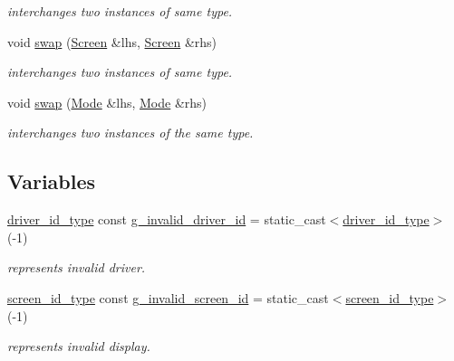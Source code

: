 \begin{DoxyCompactItemize}
\begin{DoxyCompactList}\small\item\em interchanges two instances of same type. \end{DoxyCompactList}\item 
void \hyperlink{namespacehryky_1_1display_ab3bf4cf01896ec9a96e6963093e57d8f}{swap} (\hyperlink{classhryky_1_1display_1_1_screen}{Screen} \&lhs, \hyperlink{classhryky_1_1display_1_1_screen}{Screen} \&rhs)
\begin{DoxyCompactList}\small\item\em interchanges two instances of same type. \end{DoxyCompactList}\item 
\hypertarget{namespacehryky_1_1display_a7d37702bac4e6b0ea0a0916f57e3fd97}{void \hyperlink{namespacehryky_1_1display_a7d37702bac4e6b0ea0a0916f57e3fd97}{swap} (\hyperlink{classhryky_1_1display_1_1_mode}{Mode} \&lhs, \hyperlink{classhryky_1_1display_1_1_mode}{Mode} \&rhs)}\label{namespacehryky_1_1display_a7d37702bac4e6b0ea0a0916f57e3fd97}

\begin{DoxyCompactList}\small\item\em interchanges two instances of the same type. \end{DoxyCompactList}\end{DoxyCompactItemize}
\subsection*{Variables}
\begin{DoxyCompactItemize}
\item 
\hypertarget{namespacehryky_1_1display_a411ce13cd5bc260cff5bd2c5deecbece}{\hyperlink{namespacehryky_1_1display_a438d20137cf00d71a4a72dfb7233ec90}{driver\-\_\-id\-\_\-type} const \hyperlink{namespacehryky_1_1display_a411ce13cd5bc260cff5bd2c5deecbece}{g\-\_\-invalid\-\_\-driver\-\_\-id} = static\-\_\-cast$<$\hyperlink{namespacehryky_1_1display_a438d20137cf00d71a4a72dfb7233ec90}{driver\-\_\-id\-\_\-type}$>$(-\/1)}\label{namespacehryky_1_1display_a411ce13cd5bc260cff5bd2c5deecbece}

\begin{DoxyCompactList}\small\item\em represents invalid driver. \end{DoxyCompactList}\item 
\hypertarget{namespacehryky_1_1display_af36e96781cbbf566b325a49fa7de7e28}{\hyperlink{namespacehryky_1_1display_a09f7398edae025e4ee4e505b5cdf954c}{screen\-\_\-id\-\_\-type} const \hyperlink{namespacehryky_1_1display_af36e96781cbbf566b325a49fa7de7e28}{g\-\_\-invalid\-\_\-screen\-\_\-id} = static\-\_\-cast$<$\hyperlink{namespacehryky_1_1display_a09f7398edae025e4ee4e505b5cdf954c}{screen\-\_\-id\-\_\-type}$>$(-\/1)}\label{namespacehryky_1_1display_af36e96781cbbf566b325a49fa7de7e28}

\begin{DoxyCompactList}\small\item\em represents invalid display. \end{DoxyCompactList}\end{DoxyCompactItemize}


